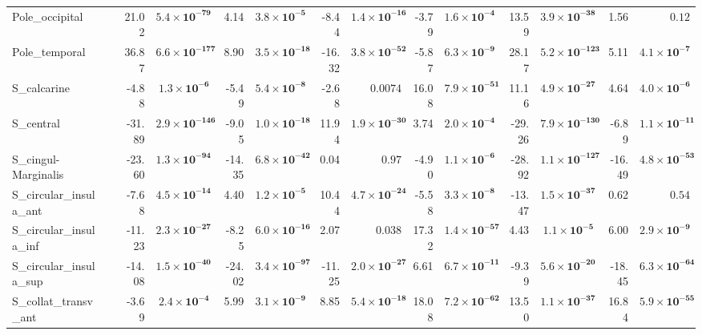 {\begin{longtable}{llrrrrrrrrrrrr}
Pole\_occipital &  & 21.02 & $\mathbf{5.4{\times}10^{-79}}$ & 4.14 & $\mathbf{3.8{\times}10^{-5}}$ & -8.44 & $\mathbf{1.4{\times}10^{-16}}$ & -3.79 & $\mathbf{1.6{\times}10^{-4}}$ & 13.59 & $\mathbf{3.9{\times}10^{-38}}$ & 1.56 & $0.12$ \\
Pole\_temporal &  & 36.87 & $\mathbf{6.6{\times}10^{-177}}$ & 8.90 & $\mathbf{3.5{\times}10^{-18}}$ & -16.32 & $\mathbf{3.8{\times}10^{-52}}$ & -5.87 & $\mathbf{6.3{\times}10^{-9}}$ & 28.17 & $\mathbf{5.2{\times}10^{-123}}$ & 5.11 & $\mathbf{4.1{\times}10^{-7}}$ \\
S\_calcarine &  & -4.88 & $\mathbf{1.3{\times}10^{-6}}$ & -5.49 & $\mathbf{5.4{\times}10^{-8}}$ & -2.68 & $0.0074$ & 16.08 & $\mathbf{7.9{\times}10^{-51}}$ & 11.16 & $\mathbf{4.9{\times}10^{-27}}$ & 4.64 & $\mathbf{4.0{\times}10^{-6}}$ \\
S\_central &  & -31.89 & $\mathbf{2.9{\times}10^{-146}}$ & -9.05 & $\mathbf{1.0{\times}10^{-18}}$ & 11.94 & $\mathbf{1.9{\times}10^{-30}}$ & 3.74 & $\mathbf{2.0{\times}10^{-4}}$ & -29.26 & $\mathbf{7.9{\times}10^{-130}}$ & -6.89 & $\mathbf{1.1{\times}10^{-11}}$ \\
S\_cingul-Marginalis &  & -23.60 & $\mathbf{1.3{\times}10^{-94}}$ & -14.35 & $\mathbf{6.8{\times}10^{-42}}$ & 0.04 & $0.97$ & -4.90 & $\mathbf{1.1{\times}10^{-6}}$ & -28.92 & $\mathbf{1.1{\times}10^{-127}}$ & -16.49 & $\mathbf{4.8{\times}10^{-53}}$ \\
S\_circular\_insula\_ant &  & -7.68 & $\mathbf{4.5{\times}10^{-14}}$ & 4.40 & $\mathbf{1.2{\times}10^{-5}}$ & 10.44 & $\mathbf{4.7{\times}10^{-24}}$ & -5.58 & $\mathbf{3.3{\times}10^{-8}}$ & -13.47 & $\mathbf{1.5{\times}10^{-37}}$ & 0.62 & $0.54$ \\
S\_circular\_insula\_inf &  & -11.23 & $\mathbf{2.3{\times}10^{-27}}$ & -8.25 & $\mathbf{6.0{\times}10^{-16}}$ & 2.07 & $0.038$ & 17.32 & $\mathbf{1.4{\times}10^{-57}}$ & 4.43 & $\mathbf{1.1{\times}10^{-5}}$ & 6.00 & $\mathbf{2.9{\times}10^{-9}}$ \\
S\_circular\_insula\_sup &  & -14.08 & $\mathbf{1.5{\times}10^{-40}}$ & -24.02 & $\mathbf{3.4{\times}10^{-97}}$ & -11.25 & $\mathbf{2.0{\times}10^{-27}}$ & 6.61 & $\mathbf{6.7{\times}10^{-11}}$ & -9.39 & $\mathbf{5.6{\times}10^{-20}}$ & -18.45 & $\mathbf{6.3{\times}10^{-64}}$ \\
S\_collat\_transv\_ant &  & -3.69 & $\mathbf{2.4{\times}10^{-4}}$ & 5.99 & $\mathbf{3.1{\times}10^{-9}}$ & 8.85 & $\mathbf{5.4{\times}10^{-18}}$ & 18.08 & $\mathbf{7.2{\times}10^{-62}}$ & 13.50 & $\mathbf{1.1{\times}10^{-37}}$ & 16.84 & $\mathbf{5.9{\times}10^{-55}}$ \\

\end{longtable}}
